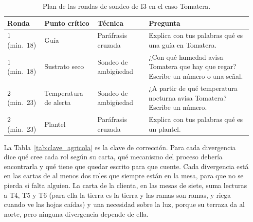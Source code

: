 \documentclass[12pt,letterpaper,oneside]{report}
\begin{document}
\begin{table}[H]
\caption{Plan de las rondas de sondeo de I3 en el caso Tomatera.}
\label{tab:rondas_agricola}
\centering
\footnotesize
\renewcommand{\arraystretch}{1.12}
\begin{tabularx}{\textwidth}{@{}L{1.4cm} L{2.6cm} L{2.6cm} Y@{}}
\toprule
\textbf{Ronda} & \textbf{Punto crítico} & \textbf{Técnica} & \textbf{Pregunta} \\
 (min.~18) & Guía & Paráfrasis cruzada & Explica con tus palabras qué es una
guía en Tomatera. \\
1 (min.~18) & Sustrato seco & Sondeo de ambigüedad & ¿Con qué humedad avisa
Tomatera que hay que regar? Escribe un número o una señal. \\
2 (min.~23) & Temperatura de alerta & Sondeo de ambigüedad & ¿A partir de qué
temperatura nocturna avisa Tomatera? Escribe un número. \\
2 (min.~23) & Plantel & Paráfrasis cruzada & Explica con tus palabras qué es un
plantel. \\
\bottomrule
\end{tabularx}
\end{table}

La Tabla~\ref{tab:clave_agricola} es la clave de corrección. Para cada
divergencia dice qué cree cada rol según su carta, qué mecanismo del proceso
debería encontrarla y qué tiene que quedar escrito para que cuente. Cada
divergencia está en las cartas de al menos dos roles que siempre están en la
mesa, para que no se pierda si falta alguien. La carta de la clienta, en las mesas de siete, suma lecturas a
T4, T5 y T6 (para ella la tierra es la tierra y las ramas son ramas, y riega
cuando ve las hojas caídas) y una necesidad sobre la luz, porque su terraza da al
norte, pero ninguna divergencia depende de ella.
\end{document}
